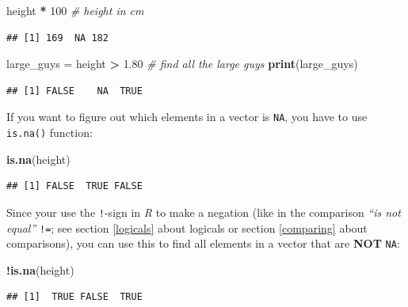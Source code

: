 \documentclass[
]{scrartcl}
\newenvironment{Shaded}{\begin{snugshade}}{\end{snugshade}}
\newcommand{\CommentTok}[1]{\textcolor[rgb]{0.56,0.35,0.01}{\textit{#1}}}
\newcommand{\DecValTok}[1]{\textcolor[rgb]{0.00,0.00,0.81}{#1}}
\newcommand{\FloatTok}[1]{\textcolor[rgb]{0.00,0.00,0.81}{#1}}
\newcommand{\FunctionTok}[1]{\textcolor[rgb]{0.13,0.29,0.53}{\textbf{#1}}}
\newcommand{\NormalTok}[1]{#1}
\newcommand{\OtherTok}[1]{\textcolor[rgb]{0.56,0.35,0.01}{#1}}
\newcommand{\SpecialCharTok}[1]{\textcolor[rgb]{0.81,0.36,0.00}{\textbf{#1}}}
\begin{document}
\begin{Shaded}
\begin{Highlighting}[]
\NormalTok{height }\SpecialCharTok{*} \DecValTok{100}  \CommentTok{\# height in cm}
\end{Highlighting}
\end{Shaded}

\begin{verbatim}
## [1] 169  NA 182
\end{verbatim}

\begin{Shaded}
\begin{Highlighting}[]
\NormalTok{large\_guys }\OtherTok{=}\NormalTok{ height }\SpecialCharTok{\textgreater{}} \FloatTok{1.80}  \CommentTok{\# find all the large guys}
\FunctionTok{print}\NormalTok{(large\_guys)}
\end{Highlighting}
\end{Shaded}

\begin{verbatim}
## [1] FALSE    NA  TRUE
\end{verbatim}

If you want to figure out which elements in a vector is \texttt{NA}, you have to use \texttt{is.na()} function:

\begin{Shaded}
\begin{Highlighting}[]
\FunctionTok{is.na}\NormalTok{(height)}
\end{Highlighting}
\end{Shaded}

\begin{verbatim}
## [1] FALSE  TRUE FALSE
\end{verbatim}

Since your use the \texttt{!}-sign in \emph{R} to make a negation (like in the comparison \emph{``is not equal''} \texttt{!=}; see section \ref{logicals} about logicals or section \ref{comparing} about comparisons), you can use this to find all elements in a vector that are \textbf{NOT} \texttt{NA}:

\begin{Shaded}
\begin{Highlighting}[]
\SpecialCharTok{!}\FunctionTok{is.na}\NormalTok{(height)}
\end{Highlighting}
\end{Shaded}

\begin{verbatim}
## [1]  TRUE FALSE  TRUE
\end{verbatim}
\end{document}

